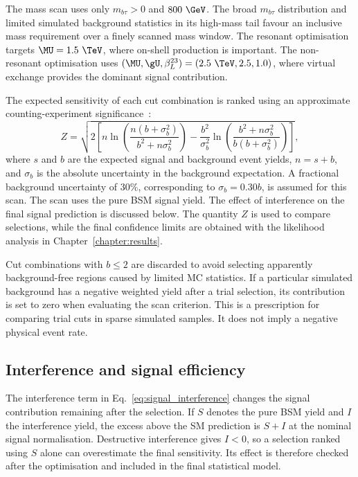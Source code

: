 The mass scan uses only $m_{b\tau}>0$ and $800~\GeV$.
The broad $m_{b\tau}$ distribution and limited simulated background statistics in its high-mass tail favour an inclusive mass requirement over a finely scanned mass window.
The resonant optimisation targets $\MU=1.5~\TeV$, where on-shell production is important.
The non-resonant optimisation uses $(\MU,\gU,\beta_L^{23})=(2.5~\TeV,2.5,1.0)$, where virtual exchange provides the dominant signal contribution.

The expected sensitivity of each cut combination is ranked using an approximate counting-experiment significance~\cite{ATL-PHYS-PUB-2020-025}:
\begin{equation}
    Z = \sqrt{2\left[n\ln\!\left(\frac{n(b+\sigma_b^2)}{b^2+n\sigma_b^2}\right)-\frac{b^2}{\sigma_b^2}\ln\!\left(\frac{b^2+n\sigma_b^2}{b(b+\sigma_b^2)}\right)\right]},
    \label{eq:ch7_optimisation_significance}
\end{equation}
where $s$ and $b$ are the expected signal and background event yields, $n=s+b$, and $\sigma_b$ is the absolute uncertainty in the background expectation.
A fractional background uncertainty of $30\%$, corresponding to $\sigma_b=0.30b$, is assumed for this scan.
The scan uses the pure BSM signal yield.
The effect of interference on the final signal prediction is discussed below.
The quantity $Z$ is used to compare selections, while the final confidence limits are obtained with the likelihood analysis in Chapter~\ref{chapter:results}.

Cut combinations with $b\leq2$ are discarded to avoid selecting apparently background-free regions caused by limited MC statistics.
If a particular simulated background has a negative weighted yield after a trial selection, its contribution is set to zero when evaluating the scan criterion.
This is a prescription for comparing trial cuts in sparse simulated samples.
It does not imply a negative physical event rate.

\subsection{Interference and signal efficiency}
\label{subsec:ch7_efficiency}

The interference term in Eq.~\ref{eq:signal_interference} changes the signal contribution remaining after the selection.
If $S$ denotes the pure BSM yield and $I$ the interference yield, the excess above the SM prediction is $S+I$ at the nominal signal normalisation.
Destructive interference gives $I<0$, so a selection ranked using $S$ alone can overestimate the final sensitivity.
Its effect is therefore checked after the optimisation and included in the final statistical model.

